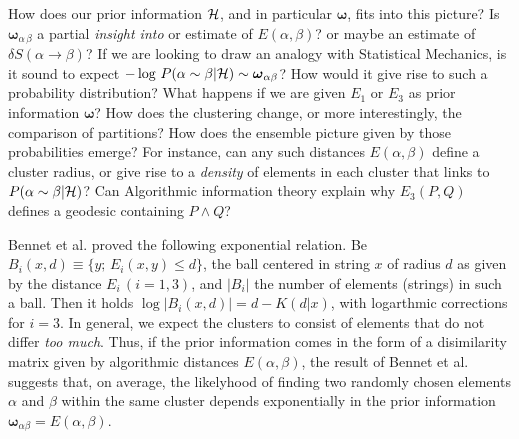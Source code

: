 \documentclass[twocolumn,aps,sort,nofootinbib]{revtex4}
\begin{document}
How does our prior information ${\cal H}$, and in particular
$\boldsymbol{\omega}$, fits into this picture? 
Is $\boldsymbol{\omega}_{\alpha\,\beta}$ a partial 
{\sl insight into} or estimate of $E(\alpha,\beta)$? or maybe an 
estimate of $\delta S(\alpha\rightarrow \beta)$? 
If we are looking to draw an analogy with Statistical Mechanics,
is it sound
to expect $-\log\,P(\alpha\sim \beta|{\cal H})\sim 
\boldsymbol{\omega}_{\alpha\beta}$?
How would it give rise to such a probability distribution? 
What happens if we are given $E_1$ or $E_3$ 
as prior information $\boldsymbol{\omega}$? How does the clustering
change, or more interestingly, the comparison of partitions?
How does the ensemble picture given by those probabilities emerge?
For instance, can any such distances $E(\alpha,\beta)$ define a cluster radius,
or give rise to a {\sl density} of elements in each cluster that
links to $P(\alpha\sim \beta|{\cal H})$?
Can Algorithmic information theory explain why $E_3(P,Q)$ defines a 
geodesic containing $P\wedge Q$? 

Bennet et al.\cite{Bennet98-1} proved the following exponential
relation. Be $B_i(x,d)\equiv\{y;\,E_i(x,y)\leq d\}$, the ball centered
in string $x$ of radius $d$ as given by the distance $E_i \,(i=1,3)$, and
$|B_i|$ the number of elements (strings) in such a ball. Then it holds
$\log |B_i(x,d)|= d-K(d|x)$, with logarthmic corrections for $i=3$.
In general, we expect the clusters to consist of elements that do not differ {\sl too much}. 
Thus, if the prior information comes in the form of a disimilarity matrix 
given by algorithmic distances $E(\alpha,\beta)$, 
the result of Bennet et al. suggests that, on average, the likelyhood
of finding two randomly chosen elements $\alpha$ and $\beta$ within
the same cluster depends exponentially in the prior information 
$\boldsymbol{\omega}_{\alpha\beta}=E(\alpha,\beta)$. 
\end{document}
